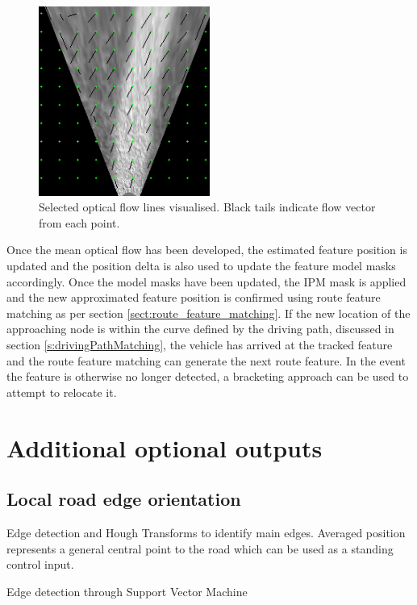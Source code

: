 \documentclass[]{aiaa-tc}%
\begin{document}
\begin{figure} %
	\centering
	\includegraphics[width=0.5\textwidth]{FeatureTracking/optical_flow_trails.png}
	\caption{Selected optical flow lines visualised. Black tails indicate flow vector from each point.}
	\label{f:optical_flow_trails}
\end{figure}

Once the mean optical flow has been developed, the estimated feature position is updated and the position delta is also used to update the feature model masks accordingly. Once the model masks have been updated, the IPM mask is applied and the new approximated feature position is confirmed using route feature matching as per section \ref{sect:route_feature_matching}. If the new location of the approaching node is within the curve defined by the driving path, discussed in section \ref{s:drivingPathMatching}, the vehicle has arrived at the tracked feature and the route feature matching can generate the next route feature. In the event the feature is otherwise no longer detected, a bracketing approach can be used to attempt to relocate it.

\section{Additional optional outputs}

\subsection{Local road edge orientation}
Edge detection and Hough Transforms to identify main edges. Averaged position represents a general central point to the road which can be used as a standing control input.

Edge detection through Support Vector Machine \cite{moncularLaneDetectAndTrack}
\end{document}

